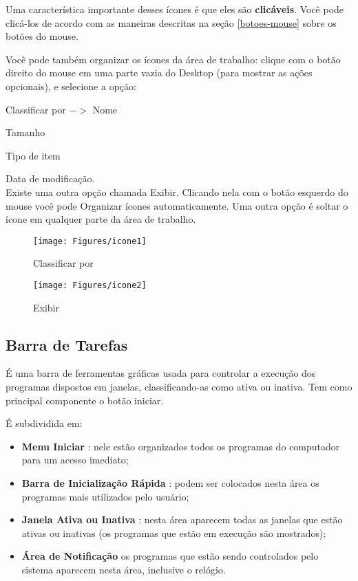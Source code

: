 \documentclass[hidelinks,12pt]{article}
\begin{document}
Uma característica importante desses ícones é que eles são \textbf{clicáveis}. Você pode clicá-los de acordo com as maneiras descritas na seção \ref{botoes-mouse} sobre os botões do mouse. 

Você pode também organizar os ícones da área de trabalho: clique com o botão direito do mouse em uma parte vazia do Desktop (para mostrar as ações opcionais), e selecione a opção:

Classificar por $->$ Nome

 \hspace{3.6cm}Tamanho

 \hspace{3.6cm}Tipo de item

 \hspace{3.6cm}Data de modificação.\\

 Existe uma outra opção chamada Exibir. Clicando nela com o botão esquerdo do mouse você pode Organizar ícones automaticamente. Uma outra opção é soltar o ícone em qualquer parte da área de trabalho.


\begin{figure}[!htbp]
	\centering
	\begin{minipage}[b]{0.45\textwidth}
		\texttt{[image: Figures/icone1]}
		\caption{Classificar por}
		\label{fig:classificar por}
	\end{minipage}
	\hfill
	\begin{minipage}[b]{0.53\textwidth}
		\texttt{[image: Figures/icone2]}
		\caption{Exibir}
		\label{fig:exibir}
	\end{minipage}
\end{figure}

\subsection{Barra de Tarefas}

É uma barra de ferramentas gráficas usada para controlar a execução dos programas dispostos em janelas, classificando-as como ativa ou inativa. Tem como principal componente o botão iniciar.

É subdividida em:

\begin{itemize}
	\item \textbf{Menu Iniciar} : nele estão organizados todos os programas do computador para um acesso imediato;

	\item \textbf{Barra de Inicialização Rápida} : podem ser colocados nesta área os programas mais utilizados pelo usuário;

	\item \textbf{Janela Ativa ou Inativa} : nesta área aparecem todas as janelas que estão ativas ou inativas (os programas que estão em execução são mostrados);

	\item \textbf{Área de Notificação} os programas que estão sendo controlados pelo sistema aparecem nesta área, inclusive o relógio.

\end{itemize}
\end{document}
